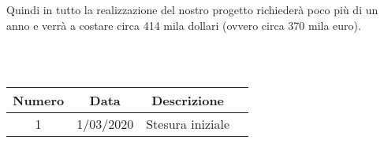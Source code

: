 \noindent Quindi in tutto la realizzazione del nostro progetto richiederà poco più di un anno e verrà a costare circa 414 mila dollari (ovvero circa 370 mila euro).

\begin{table}[b]
 \\ \\
\begin{tabular}{|c | c | c | c|} 
 	\hline
	 Numero & Data & Descrizione \\ [0.5ex] 
	\hline\hline
	1 & 1/03/2020 & Stesura iniziale \\
	\hline
\end{tabular}
\end{table}